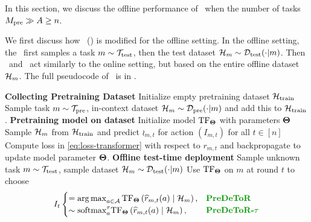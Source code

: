 In this section, we discuss the offline performance of \pred\ when the number of tasks $M_{\text{pre}} \gg A \geq n$.

We first discuss how \pred\ (\gt) is modified for the offline setting. 
%
In the offline setting, the \pred\ first samples a task $m\sim\mathcal{T}_{\text{test}}$, then the test dataset $\mathcal{H}_m\sim \mathcal{D}_{\text{test}}(\cdot|m)$. Then \pred\ and \predt\ act similarly to the online setting, but based on the entire offline dataset $\mathcal{H}_m$. 
%
The full pseudocode of \pred\ is in .

\begin{algorithm}[!tbh]
\caption{\textbf{Pre}-trained \textbf{De}cision \textbf{T}ransf\textbf{o}rmer with \textbf{R}eward Estimation (\pred)}
\label{alg:pred-off}
    \begin{algorithmic}[1]
    \STATE \textbf{Collecting Pretraining Dataset} 
    \STATE Initialize empty pretraining dataset $\mathcal{H}_{\text{train}}$
    \STATE Sample task $m \sim \mathcal{T}_{\text{pre}}$, in-context dataset $\mathcal{H}_m \sim \mathcal{D}_{\text{pre}}(\cdot | m)$ and add this to $\mathcal{H}_{\text{train}}$.
    \ENDFOR
    \STATE \textbf{Pretraining model on dataset}
    \STATE Initialize model $\mathrm{TF}_{\mathbf{\Theta}}$ with parameters $\mathbf{\Theta}$
    \STATE Sample $\mathcal{H}_m$ from $\mathcal{H}_{\text{train}}$ and predict $\wr_{m,t}$ for action $(I_{m,t})$ for all $t \in[n]$
    \STATE Compute loss in \eqref{eq:loss-transformer} with respect to $r_{m,t}$ and backpropagate to update model parameter $\mathbf{\Theta}$.
    \ENDWHILE
    \STATE \textbf{Offline test-time deployment}
    \STATE Sample unknown task $m \sim \mathcal{T}_{\text{test}}$, sample dataset $\mathcal{H}_m \sim \mathcal{D}_{\text{test}}(\cdot | m)$
    \STATE Use $\mathrm{TF}_{\mathbf{\Theta}}$ on $m$ at round $t$ to choose 
    \begin{align*}
        I_t \begin{cases}
            = \argmax_{a\in\A} \T_{\bTheta}\left( \wr_{m,t}(a) \mid \H_m\right), & \textbf{\pred} \\
            \sim \textrm{softmax}^\tau_a \T_{\bTheta}\left( \wr_{m,t}(a) \mid \H_m\right), & \textbf{\predt}
        \end{cases}
    \end{align*}
    \end{algorithmic}
\end{algorithm}
